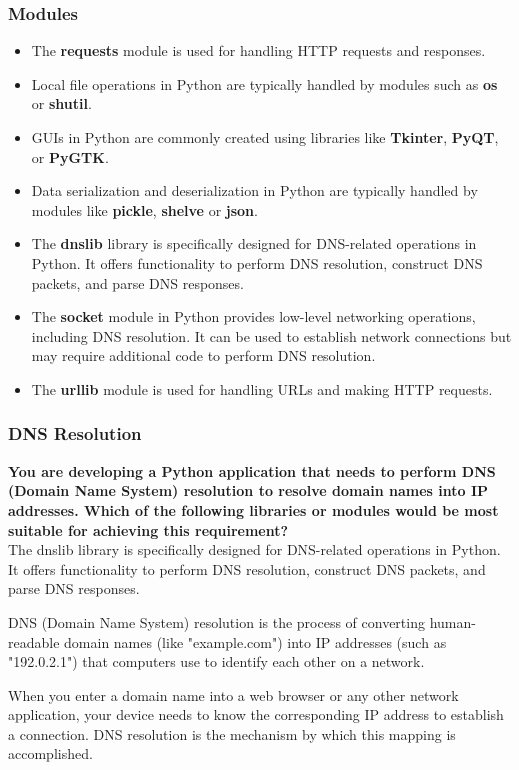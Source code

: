 \subsubsection{Modules}
\begin{itemize}
\item The \textbf{requests} module is used for handling HTTP requests and responses.
\item Local file operations in Python are typically handled by modules such as \textbf{os} or \textbf{shutil}.
\item GUIs in Python are commonly created using libraries like \textbf{Tkinter}, \textbf{PyQT}, or \textbf{PyGTK}.
\item  Data serialization and deserialization in Python are typically handled by modules like \textbf{pickle}, \textbf{shelve} or \textbf{json}.
\item The \textbf{dnslib} library is specifically designed for DNS-related operations in Python. It offers functionality to perform DNS resolution, construct DNS packets, and parse DNS responses.
\item The \textbf{socket} module in Python provides low-level networking operations, including DNS resolution. It can be used to establish network connections but may require additional code to perform DNS resolution.
\item The \textbf{urllib} module is used for handling URLs and making HTTP requests.
\end{itemize}

\subsubsection{DNS Resolution}
\textbf{You are developing a Python application that needs to perform DNS (Domain Name System) resolution to resolve domain names into IP addresses. Which of the following libraries or modules would be most suitable for achieving this requirement?}\\

The dnslib library is specifically designed for DNS-related operations in Python. It offers functionality to perform DNS resolution, construct DNS packets, and parse DNS responses.

DNS (Domain Name System) resolution is the process of converting human-readable domain names (like "example.com") into IP addresses (such as "192.0.2.1") that computers use to identify each other on a network.

When you enter a domain name into a web browser or any other network application, your device needs to know the corresponding IP address to establish a connection. DNS resolution is the mechanism by which this mapping is accomplished.

